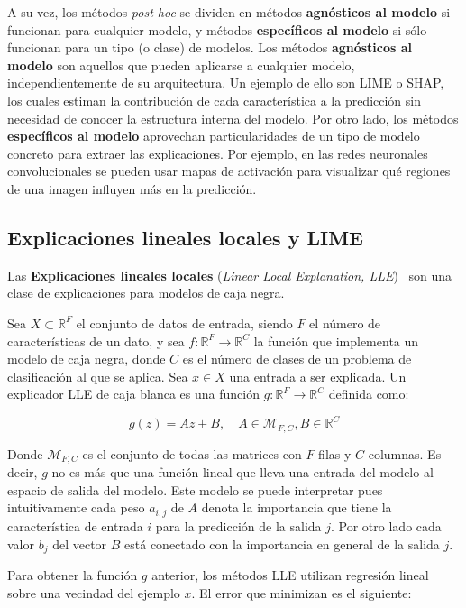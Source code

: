A su vez, los métodos \textit{post-hoc} se dividen en métodos \textbf{agnósticos al modelo} si funcionan para cualquier modelo, y métodos \textbf{específicos al modelo} si sólo funcionan para un tipo (o clase) de modelos. Los métodos \textbf{agnósticos al modelo} son aquellos que pueden aplicarse a cualquier modelo, independientemente de su arquitectura. Un ejemplo de ello son LIME o SHAP, los cuales estiman la contribución de cada característica a la predicción sin necesidad de conocer la estructura interna del modelo. Por otro lado, los métodos \textbf{específicos al modelo} aprovechan particularidades de un tipo de modelo concreto para extraer las explicaciones. Por ejemplo, en las redes neuronales convolucionales se pueden usar mapas de activación para visualizar qué regiones de una imagen influyen más en la predicción.


\subsection{Explicaciones lineales locales y LIME} \label{subsec:LIME}

Las \textbf{Explicaciones lineales locales} (\textit{Linear Local Explanation, LLE})~\cite{REVEL,LIME} son una clase de explicaciones para modelos de caja negra.

 Sea $X \subset \mathbb{R}^F$ el conjunto de datos de entrada, siendo $F$ el número de características de un dato, y sea $f : \mathbb{R}^F \rightarrow \mathbb{R}^C$ la función que implementa un modelo de caja negra, donde $C$ es el número de clases de un problema de clasificación al que se aplica. Sea $x\in X$ una entrada a ser explicada. Un explicador LLE de caja blanca es una función $g: \mathbb{R}^F \rightarrow \mathbb{R}^C$ definida como:
 
\begin{equation}
g(z) = Az + B, \quad A \in \mathcal{M}_{F,C}, B \in \mathbb{R}^C
\end{equation}

Donde $\mathcal{M}_{F,C}$ es el conjunto de todas las matrices con $F$ filas y $C$ columnas. Es decir, $g$ no es más que una función lineal que lleva una entrada del modelo al espacio de salida del modelo. Este modelo se puede interpretar pues intuitivamente cada peso $a_{i,j}$ de $A$ denota la importancia que tiene la característica de entrada $i$ para la predicción de la salida $j$. Por otro lado cada valor $b_j$ del vector $B$ está conectado con la importancia en general de la salida $j$.

Para obtener la función $g$ anterior, los métodos LLE utilizan regresión lineal sobre una vecindad del ejemplo $x$. El error que minimizan es el siguiente:

